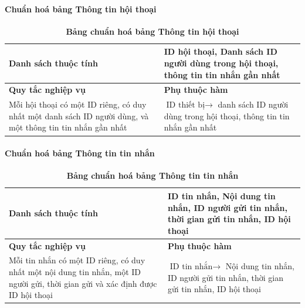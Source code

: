 \paragraph{Chuẩn hoá bảng Thông tin hội thoại}
\mbox{}

\begin{table}[H]
  \caption{\bfseries \fontsize{12pt}{0pt}\selectfont Bảng chuẩn hoá bảng Thông tin hội thoại}
  \centering
  \begin{tabularx}{0.9\textwidth}{|X|X|}
    \hline
    \textbf{Danh sách thuộc tính} & ID hội thoại, Danh sách ID người dùng trong hội thoại, thông tin tin nhắn gần nhất \\ %
    \hline
    \textbf{Quy tắc nghiệp vụ} & \textbf{Phụ thuộc hàm} \\
    \hline
    Mỗi hội thoại có một ID riêng, có duy nhất một danh sách ID người dùng, và một thông tin tin nhắn gần nhất 
      & \parbox[t]{\linewidth}{$\text{ID thiết bị} \rightarrow$ danh sách ID người dùng trong hội thoại, thông tin tin nhắn gần nhất} \\
    \hline
     \\
     \\
    \hline
  \end{tabularx}
\end{table}

\paragraph{Chuẩn hoá bảng Thông tin tin nhắn}
\mbox{}

\begin{table}[H]
  \caption{\bfseries \fontsize{12pt}{0pt}\selectfont Bảng chuẩn hoá bảng Thông tin tin nhắn}
  \centering
  \begin{tabularx}{0.9\textwidth}{|X|X|}
    \hline
    \textbf{Danh sách thuộc tính} & ID tin nhắn, Nội dung tin nhắn, ID người gửi tin nhắn, thời gian gửi tin nhắn, ID hội thoại \\ %
    \hline
    \textbf{Quy tắc nghiệp vụ} & \textbf{Phụ thuộc hàm} \\
    \hline
    Mỗi tin nhắn có một ID riêng, có duy nhất một nội dung tin nhắn, một ID người gửi, thời gian gửi và xác định
    được ID hội thoại & \parbox[t]{\linewidth}{$\text{ID tin nhắn} \rightarrow$ Nội dung tin nhắn, ID người gửi tin nhắn, thời gian gửi tin nhắn, ID hội thoại} \\
    \hline
     \\
     \\
    \hline
  \end{tabularx}
\end{table}

